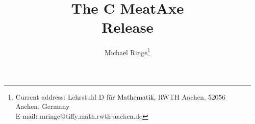 \documentclass[11pt]{report}
\def\MeatAxe{{\sf MeatAxe}}
\begin{document}
\thispagestyle{empty}
\title{The C \MeatAxe\\Release \MTXRelease}
\author{Michael Ringe\thanks{\protect\parbox[t]{0.9\linewidth}{
\protect\small Current address: Lehrstuhl D f\"ur Mathematik, RWTH Aachen,
52056 Aachen, Germany\protect\\
E-mail: mringe@tiffy.math.rwth-aachen.de}}
}
\maketitle
\date{\MTXRelDate}

\newpage
\tableofcontents




\end{document}
